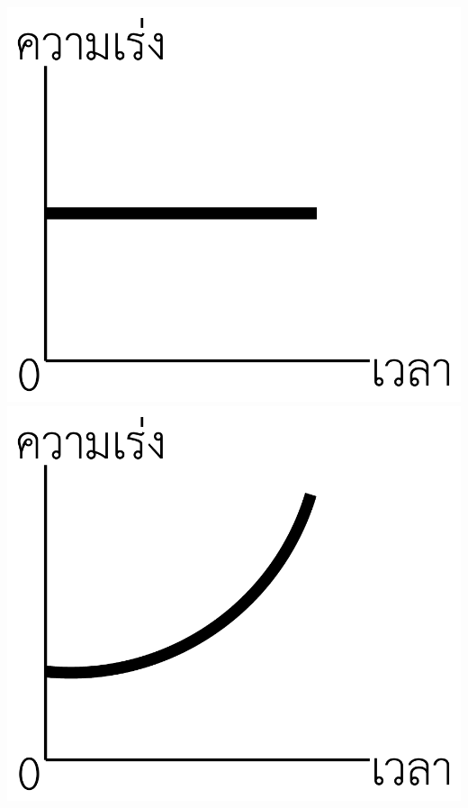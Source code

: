 \begin{enumerate}
\begin{4c}
		{\begin{adjustbox}{valign=t}\includegraphics[width=\linewidth]{pic-17-3.pdf}\end{adjustbox}}
		{\begin{adjustbox}{valign=t}\includegraphics[width=\linewidth]{pic-17-4.pdf}\end{adjustbox}}
	\end{4c} 
\end{enumerate}
